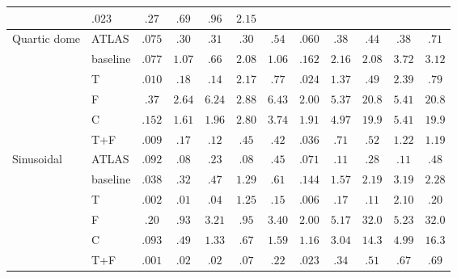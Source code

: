 \documentclass[11pt]{article}
\begin{document}
\begin{table}[ht]
\begin{tabular}{ll ccccc ccccc}
            & $\mathbf{.023}$ & $.27$  & $\mathbf{.69}$ & $.96$  & $\mathbf{2.15}$ \\
\midrule
Quartic dome
 & ATLAS    & $.075$ & $.30$  & $.31$  & $\mathbf{.30}$ & $.54$
            & $.060$ & $\mathbf{.38}$ & $\mathbf{.44}$ & $\mathbf{.38}$ & $\mathbf{.71}$ \\
 & baseline & $.077$ & $1.07$ & $.66$  & $2.08$ & $1.06$
            & $.162$ & $2.16$ & $2.08$ & $3.72$ & $3.12$ \\
 & T        & $.010$ & $.18$  & $.14$  & $2.17$ & $.77$
            & $\mathbf{.024}$ & $1.37$ & $.49$  & $2.39$ & $.79$ \\
 & F        & $.37$  & $2.64$ & $6.24$ & $2.88$ & $6.43$
            & $2.00$ & $5.37$ & $20.8$ & $5.41$ & $20.8$ \\
 & C        & $.152$ & $1.61$ & $1.96$ & $2.80$ & $3.74$
            & $1.91$ & $4.97$ & $19.9$ & $5.41$ & $19.9$ \\
 & T+F      & $\mathbf{.009}$ & $\mathbf{.17}$ & $\mathbf{.12}$ & $.45$  & $\mathbf{.42}$
            & $.036$ & $.71$  & $.52$  & $1.22$ & $1.19$ \\
\midrule
Sinusoidal
 & ATLAS    & $.092$ & $.08$  & $.23$  & $.08$  & $.45$
            & $.071$ & $\mathbf{.11}$ & $.28$  & $\mathbf{.11}$ & $.48$ \\
 & baseline & $.038$ & $.32$  & $.47$  & $1.29$ & $.61$
            & $.144$ & $1.57$ & $2.19$ & $3.19$ & $2.28$ \\
 & T        & $.002$ & $\mathbf{.01}$ & $.04$  & $1.25$ & $\mathbf{.15}$
            & $\mathbf{.006}$ & $.17$  & $\mathbf{.11}$ & $2.10$ & $\mathbf{.20}$ \\
 & F        & $.20$  & $.93$  & $3.21$ & $.95$  & $3.40$
            & $2.00$ & $5.17$ & $32.0$ & $5.23$ & $32.0$ \\
 & C        & $.093$ & $.49$  & $1.33$ & $.67$  & $1.59$
            & $1.16$ & $3.04$ & $14.3$ & $4.99$ & $16.3$ \\
 & T+F      & $\mathbf{.001}$ & $.02$  & $\mathbf{.02}$ & $\mathbf{.07}$ & $.22$
            & $.023$ & $.34$  & $.51$  & $.67$  & $.69$ \\
\bottomrule
\end{tabular}
\end{table}
\end{document}
